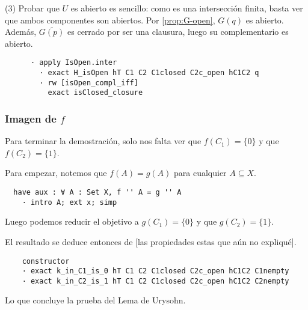 (3) Probar que $U$ es abierto es sencillo: como es una intersección finita, basta ver que ambos componentes son abiertos. Por \ref{prop:G-open}, $G(q)$ es abierto. Además, $\overline{G(p)}$ es cerrado por ser una clausura, luego su complementario es abierto.

\begin{lstlisting}
      · apply IsOpen.inter
        · exact H_isOpen hT C1 C2 C1closed C2c_open hC1C2 q
        · rw [isOpen_compl_iff]
          exact isClosed_closure
\end{lstlisting}

\subsubsection{Imagen de $f$}

Para terminar la demostración, solo nos falta ver que $f(C_1) = \{0\}$ y que $f(C_2) = \{1\}$.

Para empezar, notemos que $f(A) = g(A)$ para cualquier $A \subseteq X$.

\begin{lstlisting}
  have aux : ∀ A : Set X, f '' A = g '' A
    · intro A; ext x; simp
\end{lstlisting}

Luego podemos reducir el objetivo a $g(C_1) = \{0\}$ y que $g(C_2) = \{1\}$.

El resultado se deduce entonces de [las propiedades estas que aún no expliqué].

\begin{lstlisting}
    constructor
    · exact k_in_C1_is_0 hT C1 C2 C1closed C2c_open hC1C2 C1nempty
    · exact k_in_C2_is_1 hT C1 C2 C1closed C2c_open hC1C2 C2nempty
\end{lstlisting}

Lo que concluye la prueba del Lema de Urysohn.